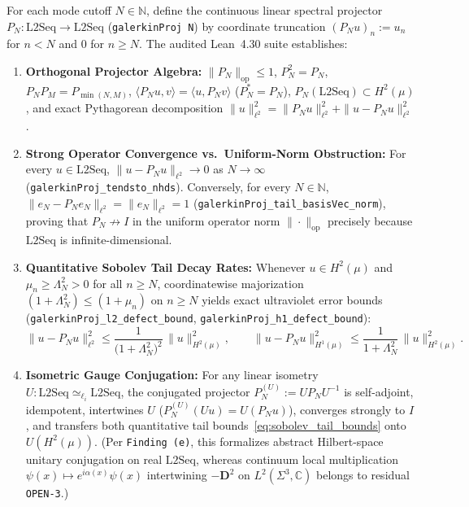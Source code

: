 For each mode cutoff $N \in \mathbb{N}$, define the continuous linear spectral projector $P_N : \mathrm{L2Seq} \to \mathrm{L2Seq}$ (\texttt{galerkinProj N}) by coordinate truncation $(P_N u)_n := u_n$ for $n < N$ and $0$ for $n \ge N$. The audited Lean~4.30 suite establishes:
\begin{enumerate}[leftmargin=2em]
  \item \textbf{Orthogonal Projector Algebra:} $\|P_N\|_{\mathrm{op}} \le 1$, $P_N^2 = P_N$, $P_N P_M = P_{\min(N,M)}$, $\langle P_N u, v\rangle = \langle u, P_N v\rangle$ ($P_N^* = P_N$), $P_N(\mathrm{L2Seq}) \subset H^2(\mu)$, and exact Pythagorean decomposition $\|u\|_{\ell^2}^2 = \|P_N u\|_{\ell^2}^2 + \|u - P_N u\|_{\ell^2}^2$.
  \item \textbf{Strong Operator Convergence vs.\ Uniform-Norm Obstruction:} For every $u \in \mathrm{L2Seq}$, $\|u - P_N u\|_{\ell^2} \to 0$ as $N \to \infty$ (\texttt{galerkin\allowbreak{}Proj\_\allowbreak{}tendsto\_\allowbreak{}nhds}). Conversely, for every $N \in \mathbb{N}$, $\|e_N - P_N e_N\|_{\ell^2} = \|e_N\|_{\ell^2} = 1$ (\texttt{galerkin\allowbreak{}Proj\_\allowbreak{}tail\_\allowbreak{}basis\allowbreak{}Vec\_\allowbreak{}norm}), proving that $P_N \not\to I$ in the uniform operator norm $\|\cdot\|_{\mathrm{op}}$ precisely because $\mathrm{L2Seq}$ is infinite-dimensional.
  \item \textbf{Quantitative Sobolev Tail Decay Rates:} Whenever $u \in H^2(\mu)$ and $\mu_n \ge \Lambda_N^2 > 0$ for all $n \ge N$, coordinatewise majorization $(1 + \Lambda_N^2) \le (1 + \mu_n)$ on $n \ge N$ yields exact ultraviolet error bounds (\texttt{galerkin\allowbreak{}Proj\_\allowbreak{}l2\_\allowbreak{}defect\_\allowbreak{}bound}, \texttt{galerkin\allowbreak{}Proj\_\allowbreak{}h1\_\allowbreak{}defect\_\allowbreak{}bound}):
  \begin{equation}
  \|u - P_N u\|_{\ell^2}^2 \le \frac{1}{\bigl(1 + \Lambda_N^2\bigr)^2}\,\|u\|_{H^2(\mu)}^2,
  \qquad
  \|u - P_N u\|_{H^1(\mu)}^2 \le \frac{1}{1 + \Lambda_N^2}\,\|u\|_{H^2(\mu)}^2.
  \label{eq:sobolev_tail_bounds}
  \end{equation}
  \item \textbf{Isometric Gauge Conjugation:} For any linear isometry $U : \mathrm{L2Seq} \simeq_{\ell_i} \mathrm{L2Seq}$, the conjugated projector $P_N^{(U)} := U P_N U^{-1}$ is self-adjoint, idempotent, intertwines $U$ ($P_N^{(U)}(Uu) = U(P_N u)$), converges strongly to $I$, and transfers both quantitative tail bounds~\eqref{eq:sobolev_tail_bounds} onto $U(H^2(\mu))$. (Per \texttt{Finding (e)}, this formalizes abstract Hilbert-space unitary conjugation on real $\mathrm{L2Seq}$, whereas continuum local multiplication $\psi(x) \mapsto e^{i\alpha(x)}\psi(x)$ intertwining $-\mathbf{D}^2$ on $L^2(\Sigma^3,\mathbb{C})$ belongs to residual \texttt{OPEN-3}.)
\end{enumerate}

